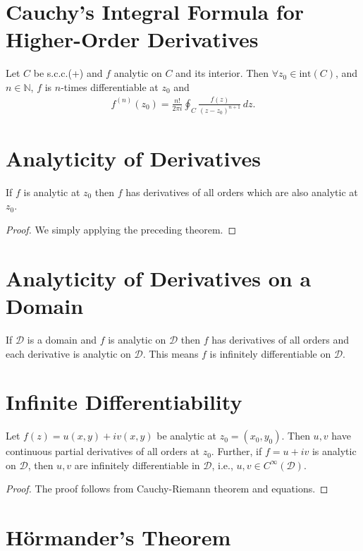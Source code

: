 \documentclass{article}
\theoremstyle{definition}
\newcommand{\f}[2]{\frac{#1}{#2}}
\begin{document}
\section{Cauchy's Integral Formula for Higher-Order Derivatives}
Let $C$ be s.c.c.(+) and $f$ analytic on $C$ and its interior. Then $\forall z_0 \in \text{int}(C)$, and $n\in \mathbb{N}$, $f$ is $n$-times differentiable at $z_0$ and 
\begin{align}
f^{(n)}(z_0) = \f{n!}{2\pi i}\oint_C \f{f(z)}{(z - z_0)^{n+1}}\,dz.
\end{align}



\section{Analyticity of Derivatives}

If $f$ is analytic at $z_0$ then $f$ has derivatives of all orders which are also analytic at $z_0$.

\begin{proof}
	We simply applying the preceding theorem.
\end{proof}

\section{Analyticity of Derivatives on a Domain}

If $\mathcal{D}$ is a domain and $f$ is analytic on $\mathcal{D}$ then $f$ has derivatives of all orders and each derivative is analytic on $\mathcal{D}$. This means $f$ is infinitely differentiable on $\mathcal{D}$. 


\section{Infinite Differentiability}

Let $f(z) = u(x,y) + iv(x,y)$ be analytic at $z_0 = (x_0, y_0)$. Then $u,v$ have continuous partial derivatives of all orders at $z_0$. Further, if $f = u+iv$ is analytic on $\mathcal{D}$, then $u,v$ are infinitely differentiable in $\mathcal{D}$, i.e., $u,v \in C^\infty(\mathcal{D})$.

\begin{proof}
	The proof follows from Cauchy-Riemann theorem and equations.
\end{proof}






\section{H\"{o}rmander's Theorem}
\end{document}
